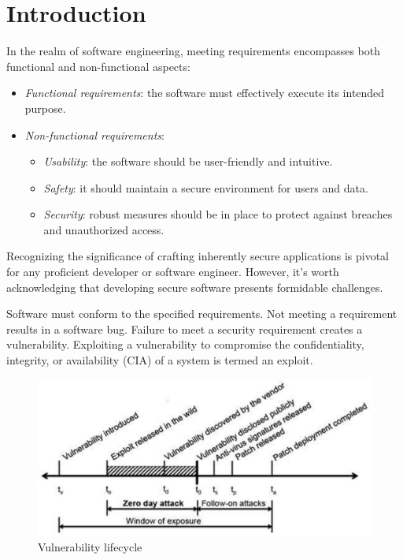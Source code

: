 \section{Introduction}

In the realm of software engineering, meeting requirements encompasses both functional and non-functional aspects:
\begin{itemize}
    \item \textit{Functional requirements}: the software must effectively execute its intended purpose.
    \item \textit{Non-functional requirements}: 
        \begin{itemize}
            \item \textit{Usability}: the software should be user-friendly and intuitive.
            \item \textit{Safety}: it should maintain a secure environment for users and data.
            \item \textit{Security}: robust measures should be in place to protect against breaches and unauthorized access.
        \end{itemize}
\end{itemize}
Recognizing the significance of crafting inherently secure applications is pivotal for any proficient developer or software engineer. 
However, it's worth acknowledging that developing secure software presents formidable challenges.

Software must conform to the specified requirements. 
Not meeting a requirement results in a software bug. 
Failure to meet a security requirement creates a vulnerability. 
Exploiting a vulnerability to compromise the confidentiality, integrity, or availability (CIA) of a system is termed an exploit.

\begin{figure}[H]
    \centering
    \includegraphics[width=0.5\linewidth]{images/vulnerability.png}
    \caption{Vulnerability lifecycle}
\end{figure}


